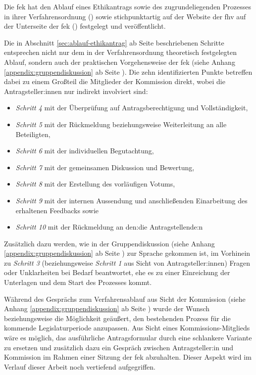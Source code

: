\documentclass[a4paper,12pt,twoside,numbers=noendperiod]{scrreprt}
\begin{document}
Die \acl{fek} hat den Ablauf eines Ethikantrags sowie des zugrundeliegenden Prozesses in ihrer Verfahrensordnung (\cite{forschungsethik-kommission_der_fachhochschule_vorarlberg_verfahrensordnung_2020}) sowie stichpunktartig auf der Website der \ac{fhv} auf der Unterseite der \ac{fek} (\cite{fachhochschule_vorarlberg_gmbh_forschungsethik-kommission_2021}) festgelegt und veröffentlicht.

Die in Abschnitt \ref{sec:ablauf-ethikantrag} ab Seite \pageref{sec:ablauf-ethikantrag} beschriebenen Schritte entsprechen nicht nur dem in der Verfahrensordnung theoretisch festgelegten Ablauf, sondern auch der praktischen Vorgehensweise der \ac{fek} (siehe Anhang \ref{appendix:gruppendiskussion} ab Seite \pageref{appendix:gruppendiskussion}). Die zehn identifizierten Punkte betreffen dabei zu einem Großteil die Mitglieder der Kommission direkt, wobei die Antragsteller:innen nur indirekt involviert sind:
\begin{itemize}
    \item \textit{Schritt 4} mit der Überprüfung auf Antragsberechtigung und Vollständigkeit,
    \item \textit{Schritt 5} mit der Rückmeldung beziehungsweise Weiterleitung an alle Beteiligten,
    \item \textit{Schritt 6} mit der individuellen Begutachtung,
    \item \textit{Schritt 7} mit der gemeinsamen Diskussion und Bewertung,
    \item \textit{Schritt 8} mit der Erstellung des vorläufigen Votums,
    \item \textit{Schritt 9} mit der internen Aussendung und anschließenden Einarbeitung des erhaltenen Feedbacks sowie
    \item \textit{Schritt 10} mit der Rückmeldung an den:die Antragstellende:n
\end{itemize}

\noindent Zusätzlich dazu werden, wie in der Gruppendiskussion (siehe Anhang \ref{appendix:gruppendiskussion} ab Seite \pageref{appendix:gruppendiskussion}) zur Sprache gekommen ist, im Vorhinein zu \textit{Schritt 3} (beziehungsweise \textit{Schritt 1} aus Sicht von Antragsteller:innen) Fragen oder Unklarheiten bei Bedarf beantwortet, ehe es zu einer Einreichung der Unterlagen und dem Start des Prozesses kommt.

\medskip

Während des Gesprächs zum Verfahrensablauf aus Sicht der Kommission (siehe Anhang \ref{appendix:gruppendiskussion} ab Seite \pageref{appendix:gruppendiskussion}) wurde der Wunsch beziehungsweise die Möglichkeit geäußert, den bestehenden Prozess für die kommende Legislaturperiode anzupassen. Aus Sicht eines Kommissions-Mitglieds wäre es möglich, das ausführliche Antragsformular durch eine schlankere Variante zu ersetzen und zusätzlich dazu ein Gespräch zwischen Antragsteller:in und Kommission im Rahmen einer Sitzung der \ac{fek} abzuhalten. Dieser Aspekt wird im Verlauf dieser Arbeit noch vertiefend aufgegriffen.
\end{document}
